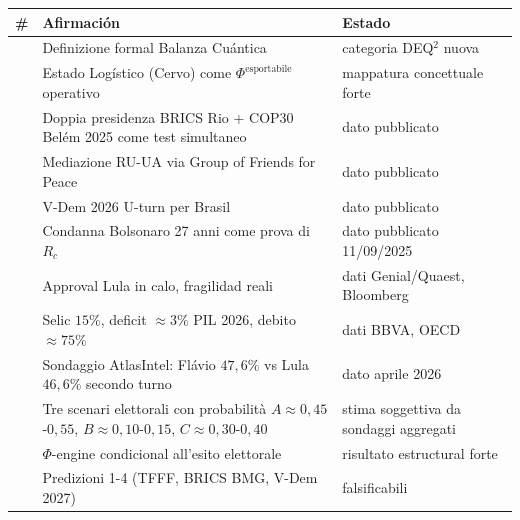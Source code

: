 {\def\LTcaptype{none} %
{\small\begin{longtable}[]{@{}
  >{\raggedright\arraybackslash}p{}
  >{\raggedright\arraybackslash}p{}
  >{\raggedright\arraybackslash}p{}@{}}
\toprule\noalign{}
\begin{minipage}[b]{\linewidth}\raggedright
\#
\end{minipage} & \begin{minipage}[b]{\linewidth}\raggedright
Afirmación
\end{minipage} & \begin{minipage}[b]{\linewidth}\raggedright
Estado
\end{minipage} \\
\midrule\noalign{}
\endhead
\bottomrule\noalign{}
\endlastfoot
1 & Definizione formal Balanza Cuántica & \Hypoth{} categoria
DEQ$^2$ nuova \\
2 & Estado Logístico (Cervo) come \(\Phi^{\text{esportabile}}\)
operativo & \Hypoth{} mappatura concettuale forte \\
3 & Doppia presidenza BRICS Rio + COP30 Belém 2025 come test simultaneo
& \Proved{} dato pubblicato \\
4 & Mediazione RU-UA via Group of Friends for Peace & \Proved{} dato
pubblicato \\
5 & V-Dem 2026 U-turn per Brasil & \Proved{} dato pubblicato \\
6 & Condanna Bolsonaro 27 anni come prova di \(R_c\) & \Proved{} dato
pubblicato 11/09/2025 \\
7 & Approval Lula in calo, fragilidad reali & \Proved{} dati
Genial/Quaest, Bloomberg \\
8 & Selic \(15\%\), deficit \(\approx 3\%\) PIL 2026, debito
\(\approx 75\%\) & \Proved{} dati BBVA, OECD \\
9 & Sondaggio AtlasIntel: Flávio \(47{,}6\%\) vs Lula \(46{,}6\%\)
secondo turno & \Proved{} dato aprile 2026 \\
10 & Tre scenari elettorali con probabilità
\(A \approx 0{,}45\)-\(0{,}55\), \(B \approx 0{,}10\)-\(0{,}15\),
\(C \approx 0{,}30\)-\(0{,}40\) & \Conj{} stima soggettiva da sondaggi
aggregati \\
11 & \(\Phi\)-engine condicional all'esito elettorale & \Hypoth{}
risultato estructural forte \\
12 & Predizioni 1-4 (TFFF, BRICS BMG, V-Dem 2027) & \Conj{}
falsificabili \\
\end{longtable}}
}



